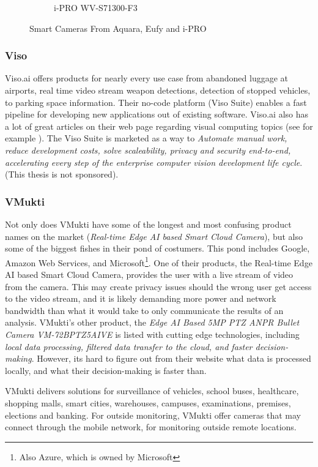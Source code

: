 \begin{figure}[H]
\begin{subfigure}{0.2\textwidth}
        \caption{\centering i-PRO WV-S71300-F3}
        \label{fig:i-PRO_camera}
    \end{subfigure}
    \caption{\centering Smart Cameras From Aquara, Eufy and i-PRO}
    \label{fig:solutions_on_the_market}
\end{figure}

\subsubsection{Viso}
\label{sec:viso}
Viso.ai offers products for nearly every use case from abandoned luggage at airports, real time video stream weapon detections, detection of stopped vehicles, to parking space information. Their no-code platform (Viso Suite) enables a fast pipeline for developing new applications out of existing software. Viso.ai also has a lot of great articles on their web page regarding visual computing topics (see for example \cite{bo2023yolov7_guide}). The Viso Suite is marketed as a way to \textit{Automate manual work, reduce development costs, solve scaleability, privacy and security end-to-end, accelerating every step of the enterprise computer vision development life cycle}. (This thesis is not sponsored).

\subsubsection{VMukti}
Not only does VMukti have some of the longest and most confusing product names on the market (\textit{Real-time Edge AI based Smart Cloud Camera}), but also some of the biggest fishes in their pond of costumers. This pond includes Google, Amazon Web Services, and Microsoft\footnote{Also Azure, which is owned by Microsoft}. One of their products, the Real-time Edge AI based Smart Cloud Camera, provides the user with a live stream of video from the camera. This may create privacy issues should the wrong user get access to the video stream, and it is likely demanding more power and network bandwidth than what it would take to only communicate the results of an analysis. VMukti's other product, the \textit{Edge AI Based 5MP PTZ ANPR Bullet Camera VM-72BPTZ5AIVE} is listed with cutting edge technologies, including \textit{local data processing, filtered data transfer to the cloud, and faster decision-making}. However, its hard to figure out from their website what data is processed locally, and what their decision-making is faster than.

VMukti delivers solutions for surveillance of vehicles, school buses, healthcare, shopping malls, smart cities, warehouses, campuses, examinations, premises, elections and banking. For outside monitoring, VMukti offer cameras that may connect through the mobile network, for monitoring outside remote locations.

